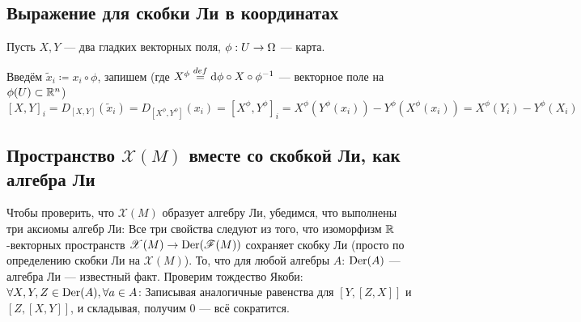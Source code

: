 \documentclass[a4paper]{report}
\begin{document}
    \subsection{Выражение для скобки Ли в координатах}
    \label{coordinate-for-lie-bracket}
    Пусть $X, Y$ --- два гладких векторных поля, $\phi: U \rightarrow \Omega$ --- карта.

    Введём $\tilde{x}_i \coloneqq x_i \circ \phi$, запишем (где $X^\phi \overset{def}{=} \operatorname{d}\!\phi \circ X \circ \phi^{-1}$ --- векторное поле на $\phi(U) \subset \mathbb{R}^n$)
    \[[X, Y]_i = D_{[X, Y]}(\tilde{x}_i) =D_{[X^\phi, Y^\phi]}(x_i) = [X^\phi, Y^\phi]_i = X^\phi (Y^\phi(x_i)) - Y^\phi (X^\phi(x_i)) = X^{\phi}(Y_i) - Y^{\phi}(X_i) \]
    \subsection{Пространство $\mathscr{X}(M)$ вместе со скобкой Ли, как алгебра Ли}
    Чтобы проверить, что $\mathscr{X}(M)$ образует алгебру Ли, убедимся, что выполнены три аксиомы алгебр Ли:
    Все три свойства следуют из того, что изоморфизм $\mathbb{R}$-векторных пространств $\mathscr{X}(M) \rightarrow \operatorname{Der}(\mathscr{F}(M))$ сохраняет скобку Ли (просто по определению скобки Ли на $\mathscr{X}(M)$).
    То, что для любой алгебры $A$: $\operatorname{Der}(A)$ --- алгебра Ли --- известный факт.
    Проверим тождество Якоби: $\forall X, Y, Z \in \operatorname{Der}(A), \forall a \in A$:
    Записывая аналогичные равенства для $[Y, [Z, X]]$ и $[Z, [X, Y]]$, и складывая, получим $0$ --- всё сократится.
\end{document}

